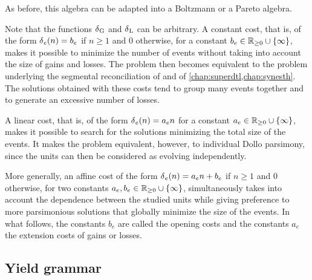 As before, this algebra can be adapted into a Boltzmann or a Pareto algebra.

Note that the functions \(\delta\kern.1pt_{\mathrm{G}}\) and \(\delta\kern.1pt_{\mathrm{L}}\) can be arbitrary.
A constant cost, that is, of the form \(\delta\kern.1pt_e(n) = b_e\) if \(n \ge 1\) and \(0\) otherwise, for a constant \(b_e \in \mathbb{R}_{\ge 0} \cup \{\infty\}\), makes it possible to minimize the number of events without taking into account the size of gains and losses.
The problem then becomes equivalent to the problem underlying the segmental reconciliation of \textcite{Delabre2020EvolutionSegmentalDuplications} and of \cref{chap:superdtl,chap:synesth}.
The solutions obtained with these costs tend to group many events together and to generate an excessive number of losses.

A linear cost, that is, of the form \(\delta\kern.1pt_e(n) = a_en\) for a constant \(a_e \in \mathbb{R}_{\ge 0} \cup \{\infty\}\), makes it possible to search for the solutions minimizing the total size of the events.
It makes the problem equivalent, however, to individual Dollo parsimony, since the units can then be considered as evolving independently.

More generally, an affine cost of the form \(\delta\kern.1pt_e(n) = a_en + b_e\) if \(n \ge 1\) and \(0\) otherwise, for two constants \(a_e, b_e \in \mathbb{R}_{\ge 0} \cup \{\infty\}\), simultaneously takes into account the dependence between the studied units while giving preference to more parsimonious solutions that globally minimize the size of the events.
In what follows, the constants \(b_e\) are called the opening costs and the constants \(a_e\) the extension costs of gains or losses.

\subsection{Yield grammar}

